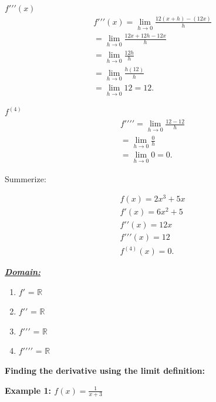 \documentclass{report}
\begin{document}
        \bigbreak \noindent 
        \textbf{$f\prime\prime\prime(x)$}
        \begin{align*}
            f\prime\prime\prime(x) = \lim\limits_{h \to 0}{ \frac{12(x+h) - (12x)}{h}} \\ 
            = \lim\limits_{h \to 0}{ \frac{12x+12h -12x}{h}} \\ 
            = \lim\limits_{h \to 0}{ \frac{12h}{h}} \\ 
            = \lim\limits_{h \to 0}{ \frac{h(12)}{h}} \\ 
            = \lim\limits_{h \to 0}{12 = 12} 
        .\end{align*}

        \bigbreak \noindent 
        $f^{(4)}$
        \begin{align*}
            f\prime\prime\prime\prime = \lim\limits_{h \to 0}{ \frac{12 - 12}{h}} \\ 
            = \lim\limits_{h \to 0}{\frac{0}{h}} \\ 
            = \lim\limits_{h \to 0}{0 = 0}
        .\end{align*}

        \pagebreak \bigbreak \noindent
       \begin{mdframed}
           Summerize:
       \end{mdframed} 
        \bigbreak \noindent 
        \begin{align*}
            f(x) = 2x^3+5x \\
            f\prime(x) = 6x^2 + 5 \\ 
            f\prime\prime(x) = 12x \\
            f\prime\prime\prime(x) = 12 \\
            f^{(4)}(x) = 0
        .\end{align*}

        \bigbreak \noindent 
        \textbf{\textit{\underline{Domain:}}}
        \begin{enumerate}
            \item $f\prime$ = $\mathbb{R}$
            \item $f\prime\prime$ = $\mathbb{R}$
            \item $f\prime\prime\prime$ = $\mathbb{R}$
            \item $f\prime\prime\prime\prime$ = $\mathbb{R}$
        \end{enumerate}

        \bigbreak \noindent 
        \begin{mdframed}
        \begin{large}
            \begin{center}
                \textbf{Finding the derivative using the limit definition:}
            \end{center}
        \end{large}
        \end{mdframed}
        \bigbreak \noindent \bigbreak \noindent 
        \begin{large}
            \textbf{Example 1: $f(x) = \frac{1}{x+3}$}
        \end{large}
\end{document}
